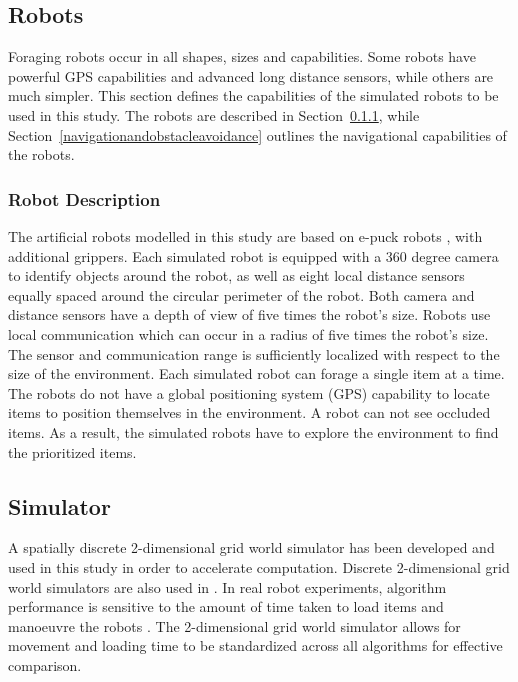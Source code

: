 \documentclass[preprint,12pt]{elsarticle}
\begin{document}
\subsection{Robots}
\label{chap:robots}

Foraging robots occur in all shapes, sizes and capabilities. Some robots have powerful GPS capabilities and advanced long distance sensors, while others are much simpler. This section defines the capabilities of the simulated robots to be used in this study. The robots are described in Section~\ref{robotdescription}, while Section~\ref{navigationandobstacleavoidance} outlines the navigational capabilities of the robots. 

\subsubsection{Robot Description}
\label{robotdescription}

The artificial robots modelled in this study are based on e-puck robots \cite{mondada2009puck}, with additional grippers. Each simulated robot is equipped with a 360 degree camera to identify objects around the robot, as well as eight local distance sensors equally spaced around the circular perimeter of the robot. Both camera and distance sensors have a depth of view of five times the robot's size. Robots use local communication which can occur in a radius of five times the robot's size. The sensor and communication range is sufficiently localized with respect to the size of the environment. Each simulated robot can forage a single item at a time. The robots do not have a global positioning system (GPS) capability to locate items to position themselves in the environment. A robot can not see occluded items. As a result, the simulated robots have to explore the environment to find the prioritized items.

\subsection{Simulator}
\label{simulator}
A spatially discrete 2-dimensional grid world simulator has been developed and used in this study in order to accelerate computation. Discrete 2-dimensional grid world simulators are also used in \cite{sugawara2002swarming, hecker2015beyond}. In real robot experiments, algorithm performance is sensitive to the amount of time taken to load items and manoeuvre the robots \cite{ostergaard2001emergent}. The 2-dimensional grid world simulator allows for movement and loading time to be standardized across all algorithms for effective comparison.
\end{document}
